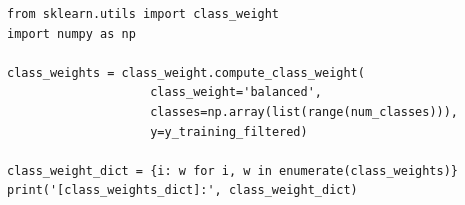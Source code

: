 \begin{lstlisting}[basicstyle=\ttfamily, caption=Cálculo de pesos por clase para balanceo, label=anxcode:class_weights_dict]
from sklearn.utils import class_weight
import numpy as np

class_weights = class_weight.compute_class_weight(
                    class_weight='balanced', 
                    classes=np.array(list(range(num_classes))), 
                    y=y_training_filtered)

class_weight_dict = {i: w for i, w in enumerate(class_weights)}
print('[class_weights_dict]:', class_weight_dict)
\end{lstlisting}